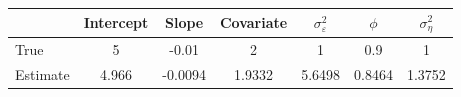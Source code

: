 \begin{tabular}{lcccccc}
\toprule
& Intercept & Slope & Covariate & $\sigma_\varepsilon^2$ & $\phi$ & $\sigma_\eta^2$ \\
\midrule
True & 5 & -0.01 & 2 & 1 & 0.9 & 1 \\
Estimate & 4.966 & -0.0094 & 1.9332 & 5.6498 & 0.8464 & 1.3752 \\
\bottomrule
\end{tabular}
